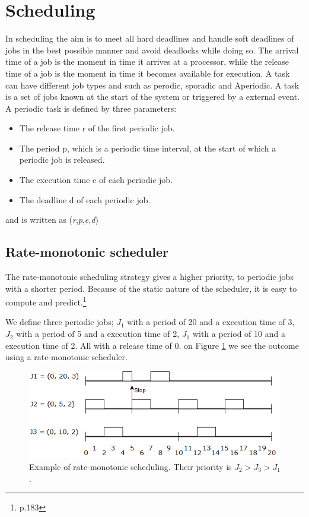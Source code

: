 \section{Scheduling} \label{sc:scheduling}
In scheduling the aim is to meet all hard deadlines and handle soft deadlines of jobs in the best possible manner and avoid deadlocks while doing so. The arrival time of a job is the moment in time it arrives at a processor, while the
release time of a job is the moment in time it becomes available for execution. A task can have different job types and such as perodic, sporadic and Aperiodic. A task is a set of jobs known at the start of the system or triggered by a external event.
A periodic task is defined by three parameters:
\begin{itemize}
	\itemsep0em
	\item The release time r of the first periodic job.
	\item The period p, which is a periodic time interval, at the start of which a periodic job is released.
	\item The execution time e of each periodic job.
	\item The deadline d of each periodic job.
\end{itemize}
and is written as (\textit{r},\textit{p},\textit{e},\textit{d})

\subsection{Rate-monotonic scheduler}
The rate-monotonic scheduling strategy gives a higher priority, to periodic jobs with a shorter period. Because of the static nature of the scheduler, it is easy to compute and predict.\footnote{\cite{Fokkink1965} p.183}


We define three periodic jobs; $J_1$ with a period of 20 and a execution time of 3, $J_2$ with a period of 5 and a execution time of 2, $J_1$ with a period of 10 and a execution time of 2. All with a release time of 0. on Figure \ref{fig:rateMonotonicExample} we see the outcome using a rate-monotonic scheduler.

\begin{figure}[h!]\label{}
	\centering
	\includegraphics[scale=0.5]{realTimeComputing/fig/rate-mono.png}
	\caption{Example of rate-monotonic scheduling. Their priority is $J_2 > J_3 > J_1$. }
	\label{fig:rateMonotonicExample}
\end{figure}

